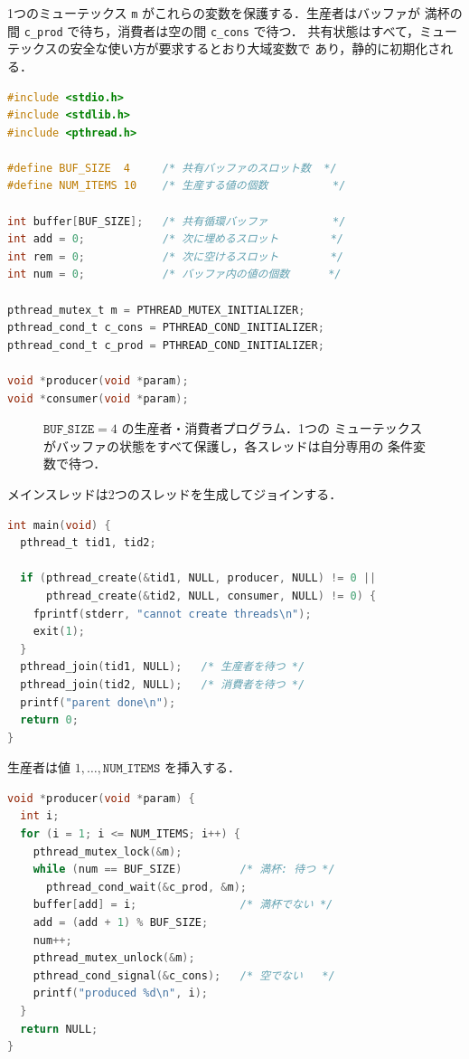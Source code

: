 \documentclass[../main.tex]{subfiles}
\begin{document}
1つのミューテックス \texttt{m} がこれらの変数を保護する．生産者はバッファが
満杯の間 \texttt{c\_prod} で待ち，消費者は空の間 \texttt{c\_cons} で待つ．
共有状態はすべて，ミューテックスの安全な使い方が要求するとおり大域変数で
あり，静的に初期化される．
\begin{lstlisting}[language=C, numbers=none]
#include <stdio.h>
#include <stdlib.h>
#include <pthread.h>

#define BUF_SIZE  4     /* 共有バッファのスロット数  */
#define NUM_ITEMS 10    /* 生産する値の個数          */

int buffer[BUF_SIZE];   /* 共有循環バッファ          */
int add = 0;            /* 次に埋めるスロット        */
int rem = 0;            /* 次に空けるスロット        */
int num = 0;            /* バッファ内の値の個数      */

pthread_mutex_t m = PTHREAD_MUTEX_INITIALIZER;
pthread_cond_t c_cons = PTHREAD_COND_INITIALIZER;
pthread_cond_t c_prod = PTHREAD_COND_INITIALIZER;

void *producer(void *param);
void *consumer(void *param);
\end{lstlisting}

\begin{figure}[htbp]
  \centering
  
  \caption{$\texttt{BUF\_SIZE}=4$ の生産者・消費者プログラム．1つの
    ミューテックスがバッファの状態をすべて保護し，各スレッドは自分専用の
    条件変数で待つ．}
  \label{fig:l04-bounded-buffer}
\end{figure}

メインスレッドは2つのスレッドを生成してジョインする．
\begin{lstlisting}[language=C, numbers=none]
int main(void) {
  pthread_t tid1, tid2;

  if (pthread_create(&tid1, NULL, producer, NULL) != 0 ||
      pthread_create(&tid2, NULL, consumer, NULL) != 0) {
    fprintf(stderr, "cannot create threads\n");
    exit(1);
  }
  pthread_join(tid1, NULL);   /* 生産者を待つ */
  pthread_join(tid2, NULL);   /* 消費者を待つ */
  printf("parent done\n");
  return 0;
}
\end{lstlisting}

生産者は値 $1,\dots,\texttt{NUM\_ITEMS}$ を挿入する．
\begin{lstlisting}[language=C, numbers=none]
void *producer(void *param) {
  int i;
  for (i = 1; i <= NUM_ITEMS; i++) {
    pthread_mutex_lock(&m);
    while (num == BUF_SIZE)         /* 満杯: 待つ */
      pthread_cond_wait(&c_prod, &m);
    buffer[add] = i;                /* 満杯でない */
    add = (add + 1) % BUF_SIZE;
    num++;
    pthread_mutex_unlock(&m);
    pthread_cond_signal(&c_cons);   /* 空でない   */
    printf("produced %d\n", i);
  }
  return NULL;
}
\end{lstlisting}
\end{document}
